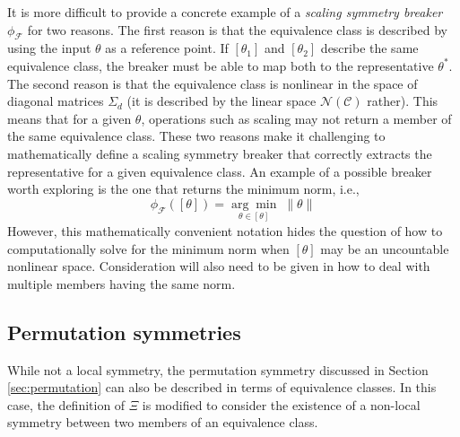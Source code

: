 It is more difficult to provide a concrete example of a \textit{scaling symmetry breaker} $\phi_\mathcal{F}$ for two reasons. The first reason is that the equivalence class is described by using the input $\theta$ as a reference point. If $[\theta_1]$ and $[\theta_2]$ describe the same equivalence class, the breaker must be able to map both to the representative $\theta^*$. The second reason is that the equivalence class is nonlinear in the space of diagonal matrices $\Sigma_d$ (it is described by the linear space $\mathcal{N}(\mathcal{C})$ rather). This means that for a given $\theta$, operations such as scaling may not return a member of the same equivalence class. These two reasons make it challenging to mathematically define a scaling symmetry breaker that correctly extracts the representative for a given equivalence class. An example of a possible breaker worth exploring is the one that returns the minimum norm, i.e.,
\[
\phi_\mathcal{F}([\theta]) = \underset{\theta\in[\theta]}{\arg\min}\;\|\theta\|
\]
However, this mathematically convenient notation hides the question of how to computationally solve for the minimum norm when $[\theta]$ may be an uncountable nonlinear space. Consideration will also need to be given in how to deal with multiple members having the same norm.

\iffalse
Under the assumption that the representative $\theta^*$ is known for all descriptions $[\cdot]$ of any equivalence class in $\Theta/\Xi$, it is straightforward to transform any $\theta$ to the representative of its class. Note that
\[
\theta = \Sigma_{d^*}\theta^*
\]
for some $d^*\in\mathcal{N}(\mathcal{C})$. Then because $\Sigma_{d^*}$ is positive definite, the inverse exists and hence
\[
\Sigma_{d^*}^{-1}\theta = \theta^*
\]
\fi


\subsection{Permutation symmetries}

While not a local symmetry, the permutation symmetry discussed in Section \ref{sec:permutation} can also be described in terms of equivalence classes. In this case, the definition of $\Xi$ is modified to consider the existence of a non-local symmetry between two members of an equivalence class. 

